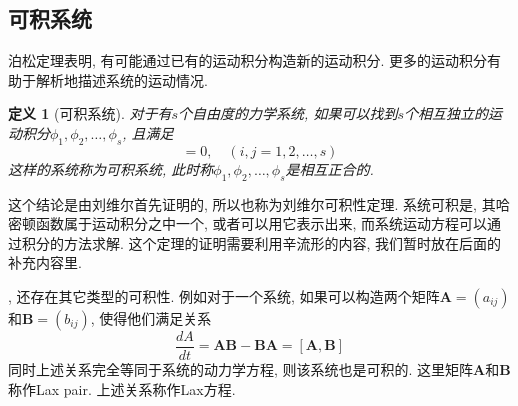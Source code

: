 \documentclass[a4paper,11pt]{book}
\newtheorem{definition}{\hspace{2em}定义}[section]
\begin{document}
\subsection{可积系统}
泊松定理表明, 有可能通过已有的运动积分构造新的运动积分. 更多的运动积分有助于解析地描述系统的运动情况.
\begin{definition}[可积系统]
  对于有$s$个自由度的力学系统, 如果可以找到$s$个相互独立的运动积分$\phi_1,\phi_2,\dots,\phi_s$, 且满足
\begin{equation*}
  [\phi_i,\phi_j]=0,\quad(i,j=1,2,\dots,s)
\end{equation*}
这样的系统称为可积系统, 此时称$\phi_1,\phi_2,\dots,\phi_s$是相互正合的.
\end{definition}
这个结论是由刘维尔首先证明的, 所以也称为刘维尔可积性定理. 系统可积是, 其哈密顿函数属于运动积分之中一个, 或者可以用它表示出来, 而系统运动方程可以通过积分的方法求解. 这个定理的证明需要利用辛流形的内容, 我们暂时放在后面的补充内容里.

, 还存在其它类型的可积性. 例如对于一个系统, 如果可以构造两个矩阵$\mathbf{A}=(a_{ij})$和$\mathbf{B}=(b_{ij})$, 使得他们满足关系
\begin{equation*}
  \frac{dA}{dt}=\mathbf{A}\mathbf{B}-\mathbf{B}\mathbf{A}=[\mathbf{A},\mathbf{B}]
\end{equation*}
同时上述关系完全等同于系统的动力学方程, 则该系统也是可积的. 这里矩阵$\mathbf{A}$和$\mathbf{B}$称作Lax pair. 上述关系称作Lax方程.
\end{document}
